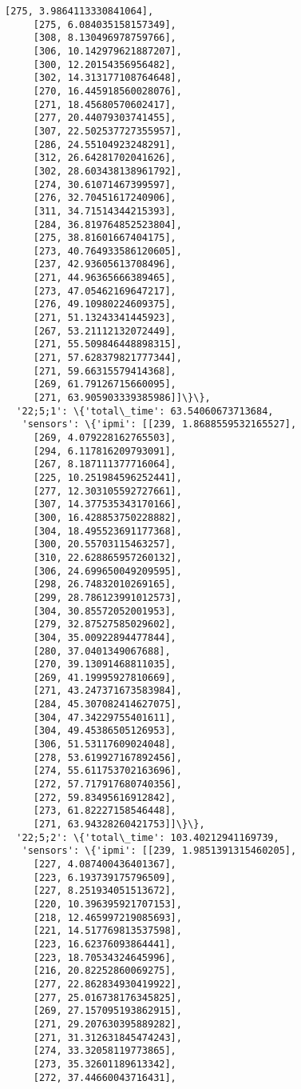 \documentclass[11pt]{article}
\begin{document}
\begin{tcolorbox}[breakable, size=fbox, boxrule=.5pt, pad at break*=1mm, opacityfill=0]
\begin{Verbatim}[commandchars=\\\{\}]
     [275, 3.9864113330841064],
     [275, 6.084035158157349],
     [308, 8.130496978759766],
     [306, 10.142979621887207],
     [300, 12.20154356956482],
     [302, 14.313177108764648],
     [270, 16.445918560028076],
     [271, 18.45680570602417],
     [277, 20.44079303741455],
     [307, 22.502537727355957],
     [286, 24.55104923248291],
     [312, 26.64281702041626],
     [302, 28.603438138961792],
     [274, 30.61071467399597],
     [276, 32.70451617240906],
     [311, 34.71514344215393],
     [284, 36.819764852523804],
     [275, 38.81601667404175],
     [273, 40.764933586120605],
     [237, 42.93605613708496],
     [271, 44.96365666389465],
     [273, 47.05462169647217],
     [276, 49.10980224609375],
     [271, 51.13243341445923],
     [267, 53.21112132072449],
     [271, 55.509846448898315],
     [271, 57.628379821777344],
     [271, 59.66315579414368],
     [269, 61.79126715660095],
     [271, 63.905903339385986]]\}\},
  '22;5;1': \{'total\_time': 63.54060673713684,
   'sensors': \{'ipmi': [[239, 1.8688559532165527],
     [269, 4.079228162765503],
     [294, 6.117816209793091],
     [267, 8.187111377716064],
     [225, 10.251984596252441],
     [277, 12.303105592727661],
     [307, 14.377535343170166],
     [300, 16.428853750228882],
     [304, 18.495523691177368],
     [300, 20.55703115463257],
     [310, 22.628865957260132],
     [306, 24.699650049209595],
     [298, 26.74832010269165],
     [299, 28.786123991012573],
     [304, 30.85572052001953],
     [279, 32.87527585029602],
     [304, 35.00922894477844],
     [280, 37.0401349067688],
     [270, 39.13091468811035],
     [269, 41.19995927810669],
     [271, 43.247371673583984],
     [284, 45.307082414627075],
     [304, 47.34229755401611],
     [304, 49.45386505126953],
     [306, 51.53117609024048],
     [278, 53.619927167892456],
     [274, 55.611753702163696],
     [272, 57.717917680740356],
     [272, 59.83495616912842],
     [273, 61.82227158546448],
     [271, 63.94328260421753]]\}\},
  '22;5;2': \{'total\_time': 103.40212941169739,
   'sensors': \{'ipmi': [[239, 1.9851391315460205],
     [227, 4.087400436401367],
     [223, 6.193739175796509],
     [227, 8.251934051513672],
     [220, 10.396395921707153],
     [218, 12.465997219085693],
     [221, 14.517769813537598],
     [223, 16.62376093864441],
     [223, 18.70534324645996],
     [216, 20.82252860069275],
     [277, 22.862834930419922],
     [277, 25.016738176345825],
     [269, 27.157095193862915],
     [271, 29.207630395889282],
     [271, 31.312631845474243],
     [274, 33.32058119773865],
     [273, 35.32601189613342],
     [272, 37.44660043716431],

\end{Verbatim}
\end{tcolorbox}
\end{document}

